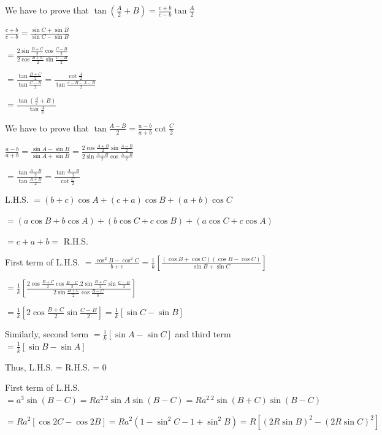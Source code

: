 \item We have to prove that $\tan\left(\frac{A}{2} + B\right) = \frac{c + b}{c - b}\tan \frac{A}{2}$

  $\frac{c + b}{c - b} = \frac{\sin C + \sin B}{\sin C - \sin B}$

  $= \frac{2\sin\frac{B + C}{2}\cos\frac{C - B}{2}}{2\cos\frac{B + C}{2}\sin\frac{C - B}{2}}$

  $= \frac{\tan\frac{B + C}{2}}{\tan\frac{C - B}{2}} = \frac{\cot\frac{A}{2}}{\tan\frac{\pi - B - A - B}{2}}$

  $= \frac{\tan\left(\frac{A}{2} + B\right)}{\tan\frac{A}{3}}$

\item We have to prove that $\tan\frac{A - B}{2} = \frac{a - b}{a + b}\cot\frac{C}{2}$

  $\frac{a - b}{a + b} = \frac{\sin A - \sin B}{\sin A + \sin B} = \frac{2\cos\frac{A + B}{2}\sin\frac{A -
    B}{2}}{2\sin\frac{A + B}{2}\cos\frac{A - B}{2}}$

  $= \frac{\tan\frac{A - B}{2}}{\tan \frac{A + B}{2}} = \frac{\tan\frac{A - B}{2}}{\cot\frac{C}{2}}$

\item L.H.S. $= (b + c)\cos A + (c + a)\cos B + (a + b)\cos C$

  $= (a\cos B + b\cos A) + (b\cos C + c\cos B) + (a\cos C + c\cos A)$

  $= c + a + b =$ R.H.S.

\item First term of L.H.S. $= \frac{\cos^2B - \cos^2C}{b + c} = \frac{1}{k}\left[\frac{(\cos B + \cos C)(\cos B - \cos C)}{\sin
    B + \sin C}\right]$

  $= \frac{1}{k}\left[\frac{2\cos\frac{B+C}{2}\cos\frac{B - C}{2}.2\sin\frac{B + C}{2}\sin\frac{C - B}{2}}{2\sin\frac{B +
      C}{2}\cos\frac{B - C}{3}}\right]$

  $= \frac{1}{k}\left[2\cos\frac{B + C}{2}\sin\frac{C - B}{2}\right] = \frac{1}{k}[\sin C - \sin B]$

  Similarly, second term $= \frac{1}{k}[\sin A - \sin C]$ and third term $= \frac{1}{k}[\sin B - \sin A]$

  Thus, L.H.S. = R.H.S. = 0

\item First term of L.H.S. $= a^3\sin(B - C) = Ra^2.2\sin A\sin(B - C) = Ra^2.2\sin(B + C)\sin(B - C)$

  $= Ra^2[\cos 2C - \cos 2B] = Ra^2(1 - \sin^2C - 1 + \sin^2B) = R[(2R\sin B)^2 - (2R\sin C)^2]$


